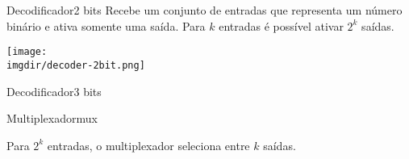 

\section{\insertlecture}

\frame{\title{\insertlecture}\maketitle}

\begin{frame}{Decodificador}{2 bits}
  \small Recebe um conjunto de entradas que representa um número
  binário e ativa somente uma saída. Para \alert{$k$} entradas é possível
  ativar \alert{$2^k$} saídas.

\bigskip
  \texttt{[image: \\imgdir/decoder-2bit.png]}
\end{frame}

\begin{frame}{Decodificador}{3 bits}
  
\end{frame}

\begin{frame}{Multiplexador}{mux}

Para \alert{$2^k$} entradas, o \alert{multiplexador} seleciona entre \alert{$k$} saídas.

\begin{center}

\end{center}

\end{frame}
 
